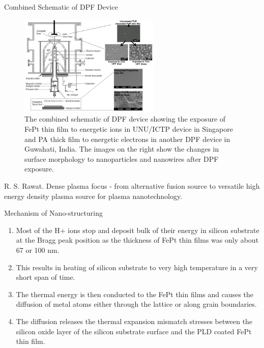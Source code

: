 \begin{frame} {Combined Schematic of DPF Device}
    \begin{figure}
        \centering
        \includegraphics[width=0.6\textwidth]{figures/combined-schematic-of-dpf-device.png}
        \caption{\scriptsize The combined schematic of DPF device showing the exposure of FePt thin film to energetic ions in UNU/ICTP device in Singapore and PA thick film to energetic electrons in another DPF device in Guwahati, India. The images on the right show the changes in surface morphology to nanoparticles and nanowires after DPF exposure. \cite{rawat_2015_dense}}
        \label{fig:combined-schematic-of-dpf-device}
    \end{figure}
    \tiny{\cite{rawat_2015_dense} R. S. Rawat. Dense plasma focus - from alternative fusion source to versatile high energy density plasma source for plasma nanotechnology.}
\end{frame}

\begin{frame} {Mechanism of Nano-structuring}
    \begin{enumerate}
        \item Most of the H+ ions stop and deposit bulk of their energy in silicon substrate at the Bragg peak position as the thickness of FePt thin films was only about 67 or 100 nm.
        \item This results in heating of silicon substrate to very high temperature in a very short span of time.
        \item The thermal energy is then conducted to the FePt thin films and causes the diffusion of metal atoms either through the lattice or along grain boundaries.
        \item The diffusion releases the thermal expansion mismatch stresses between the silicon oxide layer of the silicon substrate surface and the PLD coated FePt thin film.
    \end{enumerate}
\end{frame}

